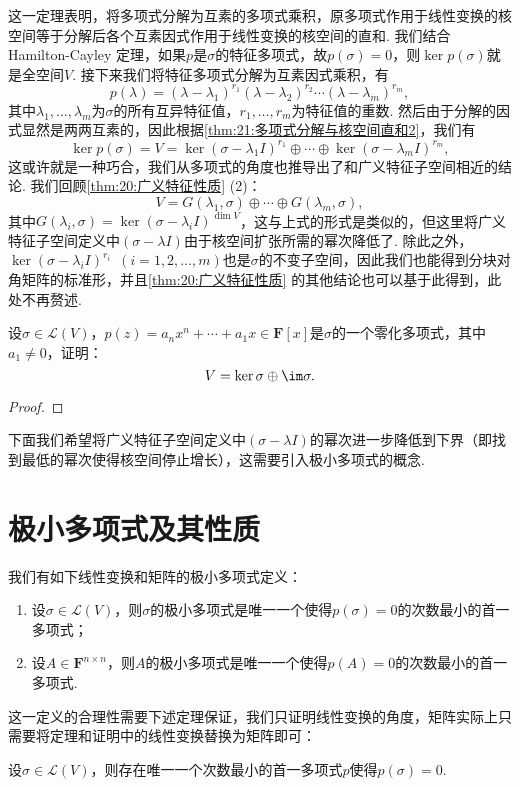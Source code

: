 这一定理表明，将多项式分解为互素的多项式乘积，原多项式作用于线性变换的核空间等于分解后各个互素因式作用于线性变换的核空间的直和. 我们结合 Hamilton-Cayley 定理，如果$p$是$\sigma$的特征多项式，故$p(\sigma)=0$，则$\ker p(\sigma)$就是全空间$V$. 接下来我们将特征多项式分解为互素因式乘积，有
\[p(\lambda)=(\lambda-\lambda_1)^{r_1}(\lambda-\lambda_2)^{r_2}\cdots(\lambda-\lambda_m)^{r_m},\]
其中$\lambda_1,\ldots,\lambda_m$为$\sigma$的所有互异特征值，$r_1,\ldots,r_m$为特征值的重数. 然后由于分解的因式显然是两两互素的，因此根据\autoref{thm:21:多项式分解与核空间直和2}，我们有
\[\ker p(\sigma)=V=\ker (\sigma-\lambda_1I)^{r_1}\oplus\cdots\oplus\ker (\sigma-\lambda_mI)^{r_m},\]
这或许就是一种巧合，我们从多项式的角度也推导出了和广义特征子空间相近的结论. 我们回顾\autoref{thm:20:广义特征性质} (2)：
\[V=G(\lambda_1,\sigma)\oplus\cdots\oplus G(\lambda_m,\sigma),\]
其中$G(\lambda_i,\sigma)=\ker (\sigma-\lambda_iI)^{\dim V}$，这与上式的形式是类似的，但这里将广义特征子空间定义中$(\sigma-\lambda I)$由于核空间扩张所需的幂次降低了. 除此之外，$\ker (\sigma-\lambda_iI)^{r_i}\enspace(i=1,2,\ldots,m)$也是$\sigma$的不变子空间，因此我们也能得到分块对角矩阵的标准形，并且\autoref{thm:20:广义特征性质} 的其他结论也可以基于此得到，此处不再赘述.
\begin{example}
    设$\sigma\in \mathcal{L}(V)$，$p(z)=a_nx^n+\cdots+a_1x\in\mathbf{F}[x]$是$\sigma$的一个零化多项式，其中$a_1\neq 0$，证明：
    \[V=\ker \sigma\oplus\im\sigma.\]
\end{example}

\begin{proof}

\end{proof}

下面我们希望将广义特征子空间定义中$(\sigma-\lambda I)$的幂次进一步降低到下界（即找到最低的幂次使得核空间停止增长），这需要引入极小多项式的概念.

\section{极小多项式及其性质}

\begin{definition}
    我们有如下线性变换和矩阵的极小多项式定义：
    \begin{enumerate}
        \item 设$\sigma\in \mathcal{L}(V)$，则$\sigma$的极小多项式是唯一一个使得$p(\sigma)=0$的次数最小的首一多项式；

        \item 设$A\in\mathbf{F}^{n\times n}$，则$A$的极小多项式是唯一一个使得$p(A)=0$的次数最小的首一多项式.
    \end{enumerate}
\end{definition}
这一定义的合理性需要下述定理保证，我们只证明线性变换的角度，矩阵实际上只需要将定理和证明中的线性变换替换为矩阵即可：
\begin{theorem}\label{thm:21:极小多项式存在}
    设$\sigma\in \mathcal{L}(V)$，则存在唯一一个次数最小的首一多项式$p$使得$p(\sigma)=0$.
\end{theorem}

